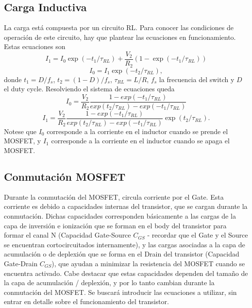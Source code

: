 \documentclass[e4_tp1_main.tex]{subfiles}
\begin{document}
\subsection{Carga Inductiva}
La carga está compuesta por un circuito RL. Para conocer las condiciones de operación de este circuito, hay que plantear las ecuaciones en funcionamiento. Estas ecuaciones son
\begin{equation}
I_1 = I_0\exp(-t_1/\tau_{RL})+\frac{V_2}{R_2}(1-\exp(-t_1/\tau_{RL}))
\end{equation}
\begin{equation}
I_0 = I_1\exp(-t_2/\tau_{RL}),
\end{equation}
donde $t_1 = D/f_s$, $t_2 = (1-D)/f_s$, $\tau_{RL}=L/R$, $f_s$ la frecuencia del switch y $D$ el duty cycle. Resolviendo el sistema de ecuaciones queda
\begin{equation}
I_0 = \frac{V_2}{R_2}\frac{1-exp(-t_1/\tau_{RL})}{exp(t_2/\tau_{RL})-exp(-t_1/\tau_{RL})}
\end{equation}
\begin{equation}
I_1 = \frac{V_2}{R_2}\frac{1-exp(-t_1/\tau_{RL})}{exp(t_2/\tau_{RL})-exp(-t_1/\tau_{RL})}\exp(t_2/\tau_{RL}).
\end{equation}
Notese que $I_0$ corresponde a la corriente en el inductor cuando se prende el MOSFET, y $I_1$ corresponde a la corriente en el inductor cuando se apaga el MOSFET.

\subsection{Conmutación MOSFET}

Durante la conmutación del MOSFET, circula corriente por el Gate. Esta corriente es debido a capacidades internas del transistor, que se cargan durante la conmutación. Dichas capacidades corresponden básicamente a las cargas de la capa de inversión e ionización que se forman en el body del transistor para formar el canal N (Capacidad Gate-Source $C_{GS}$ - recordar que el Gate y el Source se encuentran cortocircuitados internamente), y las cargas asociadas a la capa de acumulación o de deplexión que se forma en el Drain del transistor (Capacidad Gate-Drain $C_{GS}$), que ayudan a minimizar la resistencia del MOSFET cuando se encuentra activado. Cabe destacar que estas capacidades dependen del tamaño de la capa de acumulación / deplexión, y por lo tanto cambian durante la conmutación del MOSFET. Se buscará introducir las ecuaciones a utilizar, sin entrar en detalle sobre el funcionamiento del transistor.
\end{document}
